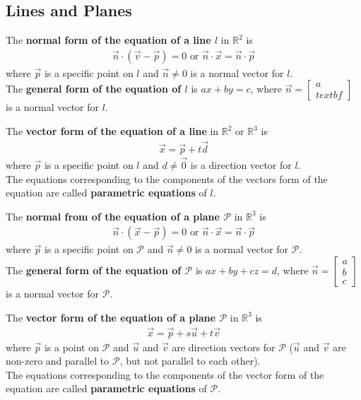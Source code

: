 \documentclass{article}
\begin{document}
\subsection{Lines and Planes}
\begin{definition}
	The \textbf{normal form of the equation of a line $l$} in $\mathbb{R}^2$ is
	\begin{gather*}
		\vec n \cdot (\vec v - \vec p) = 0 \text{  or  } \vec n \cdot \vec x = \vec n \cdot \vec p
	\end{gather*}
	where $\vec p$ is a specific point on $l$ and $\vec n \not= 0$ is a normal vector for $l$.\\
	The \textbf{general form of the equation of $l$} is $ax+by=c$, where $\vec n = \begin{bmatrix}
			a \\textbf
		\end{bmatrix}$ is a normal vector for $l$.
\end{definition}
\begin{definition}
	The \textbf{vector form of the equation of a line} in $\mathbb{R}^2$ or $\mathbb{R}^3$ is
	\begin{gather*}
		\vec x = \vec p + t \vec d
	\end{gather*}
	where $\vec p$ is a specific point on $l$ and $d\not=\vec 0$ is a direction vector for $l$.\\
	The equations corresponding to the components of the vectors form of the equation are called \textbf{parametric equations} of $l$.
\end{definition}
\begin{definition}
	The \textbf{normal from of the equation of a plane $\mathcal{P}$} in $\mathbb{R}^3$ is
	\begin{gather*}
		\vec n \cdot (\vec x - \vec p) = 0 \text{  or  } \vec n \cdot \vec x = \vec n \cdot \vec p
	\end{gather*}
	where $\vec p$ is a specific point on $\mathcal{P}$ and $\vec n \not= 0$ is a normal vector for $\mathcal{P}$.\\
	The \textbf{general form of the equation of $\mathcal{P}$} is $ax + by + cz = d$, where $\vec n = \begin{bmatrix}
			a \\ b \\ c
		\end{bmatrix}$ is a normal vector for $\mathcal{P}$.
\end{definition}
\begin{definition}
	The \textbf{vector form of the equation of a plane $\mathcal{P}$} in $\mathbb{R}^3$ is
	\begin{gather*}
		\vec x = \vec p + s \vec u + t \vec v
	\end{gather*}
	where $\vec p$ is a point on $\mathcal{P}$ and $\vec u$ and $\vec v$ are direction vectors for $\mathcal{P}$ ($\vec u$ and $\vec v$ are non-zero and parallel to $\mathcal{P}$, but not parallel to each other).\\
	The equations corresponding to the components of the vector form of the equation are called \textbf{parametric equations} of $\mathcal{P}$.
\end{definition}
\end{document}
